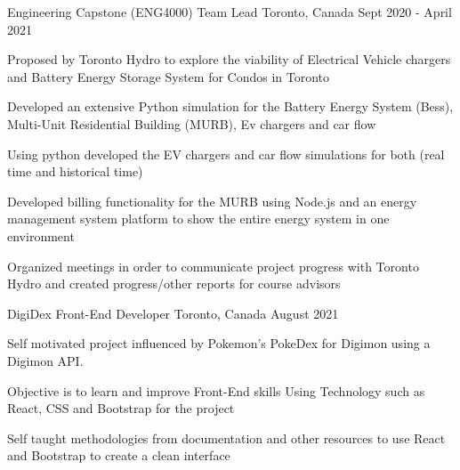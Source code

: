 


\begin{cventries}


\cventry
{Engineering Capstone (ENG4000)} %
{Team Lead} %
{Toronto, Canada} %
{Sept 2020 - April 2021} %
{ %
\begin{cvitems}
\item {Proposed by Toronto Hydro to explore the viability of Electrical Vehicle chargers and Battery Energy Storage System for Condos in Toronto}
\item {Developed an extensive Python simulation for the Battery Energy System (Bess), Multi-Unit Residential Building (MURB), Ev chargers and car flow}
\item {Using python developed the EV chargers and car flow simulations for both (real time and historical time)}
\item {Developed billing functionality for the MURB using Node.js and an energy management system platform to show the entire energy system in one environment}
\item {Organized meetings in order to communicate project progress with Toronto Hydro and created progress/other reports for course advisors}
\end{cvitems}
}

\cventry
{DigiDex} %
{Front-End Developer} %
{Toronto, Canada} %
{August 2021} %
{ %
\begin{cvitems}
\item {Self motivated project influenced by Pokemon's PokeDex for Digimon using a Digimon API.}
\item {Objective is to learn and improve Front-End skills Using Technology such as React, CSS and Bootstrap for the project}
\item {Self taught methodologies from documentation and other resources to use React and Bootstrap to create a clean interface}
\end{cvitems}
}

\end{cventries}